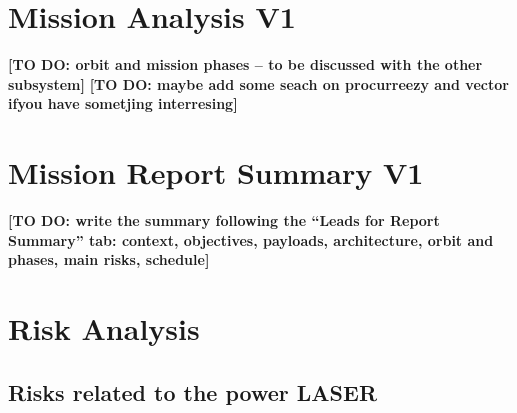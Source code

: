 \documentclass[11pt,a4paper]{article}
\newcommand{\todo}[1]{\textbf{[TO DO: #1]}}
\begin{document}
\section{Mission Analysis V1}

\todo{orbit and mission phases -- to be discussed with the other subsystem}
\todo{maybe add some seach on procurreezy and vector ifyou have sometjing interresing}

\section{Mission Report Summary V1}
\todo{write the summary following the ``Leads for Report Summary'' tab: context, objectives, payloads, architecture, orbit and phases, main risks, schedule}

\section{Risk Analysis}

\subsection{Risks related to the power LASER}
\end{document}
